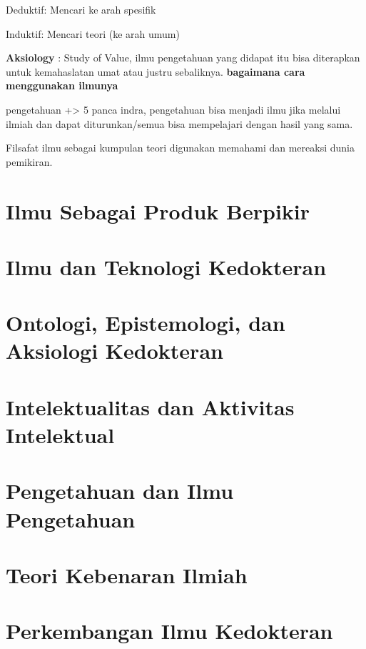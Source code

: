 \documentclass[
  letterpaper,
  DIV=11,
  numbers=noendperiod]{scrreprt}
\begin{document}
Deduktif: Mencari ke arah spesifik

Induktif: Mencari teori (ke arah umum)

\textbf{Aksiology} : Study of Value, ilmu pengetahuan yang didapat itu
bisa diterapkan untuk kemahaslatan umat atau justru sebaliknya.
\textbf{bagaimana cara menggunakan ilmunya}

pengetahuan +\textgreater{} 5 panca indra, pengetahuan bisa menjadi ilmu
jika melalui ilmiah dan dapat diturunkan/semua bisa mempelajari dengan
hasil yang sama.

Filsafat ilmu sebagai kumpulan teori digunakan memahami dan mereaksi
dunia pemikiran.

\section{Ilmu Sebagai Produk
Berpikir}\label{ilmu-sebagai-produk-berpikir}

\section{Ilmu dan Teknologi
Kedokteran}\label{ilmu-dan-teknologi-kedokteran}

\section{Ontologi, Epistemologi, dan Aksiologi
Kedokteran}\label{ontologi-epistemologi-dan-aksiologi-kedokteran}

\section{Intelektualitas dan Aktivitas
Intelektual}\label{intelektualitas-dan-aktivitas-intelektual}

\section{Pengetahuan dan Ilmu
Pengetahuan}\label{pengetahuan-dan-ilmu-pengetahuan}

\section{Teori Kebenaran Ilmiah}\label{teori-kebenaran-ilmiah}

\section{Perkembangan Ilmu
Kedokteran}\label{perkembangan-ilmu-kedokteran}
\end{document}
